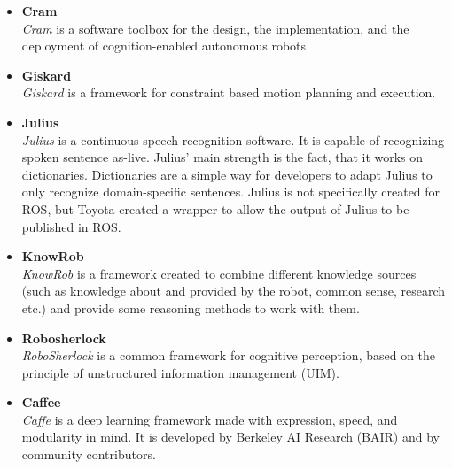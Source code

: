 \documentclass[main.tex]{subfiles}
\begin{document}
			\begin{itemize}
				\item{\textbf{Cram}} \\
					 \textit{Cram} is a software toolbox for the design, the implementation, and the deployment of cognition-enabled autonomous robots
				\item{\textbf{Giskard}} \\
					\textit{Giskard} is a  framework for constraint based motion planning and execution.
				\item{\textbf{Julius}} \\
					\textit{Julius} is a continuous speech recognition software. It is capable of recognizing spoken sentence as-live. Julius' main strength is the fact, that it works on dictionaries. Dictionaries are a simple way for developers to adapt Julius to only recognize domain-specific sentences. Julius is not specifically created for ROS, but Toyota created a wrapper to allow the output of Julius to be published in ROS.
				\item{\textbf{KnowRob}} \\
				    \textit{KnowRob} is a framework created to combine different knowledge sources (such as knowledge about and provided by the robot, common sense, research etc.) and provide some reasoning methods to work with them. 
				\item{\textbf{Robosherlock}} \\
					\textit{RoboSherlock} is a common framework for cognitive perception, based on the principle of unstructured information management (UIM).
				\item{\textbf{Caffee}} \\
					\textit{Caffe} is a deep learning framework made with expression, speed, and modularity in mind. It is developed by Berkeley AI Research (BAIR) and by community contributors.

			\end{itemize}
	  		 

	\endgroup
\end{document}
